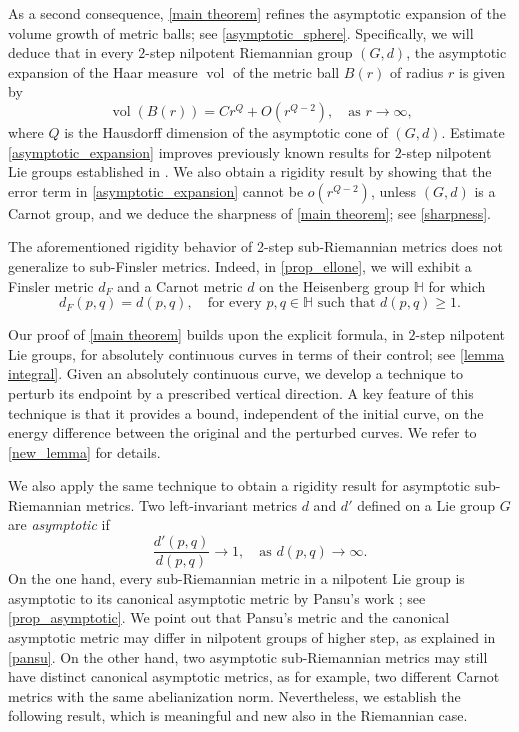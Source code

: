 \documentclass[a4paper,11pt,reqno]{amsart}
\theoremstyle{plain}
\theoremstyle{definition}
\renewcommand{\H}{\mathbb H}
\begin{document}
As a second consequence,
\cref{main theorem} refines the asymptotic expansion of the volume growth of metric balls; see \cref{asymptotic_sphere}. Specifically, we will deduce that in every $2$-step nilpotent Riemannian group $(G,d)$, the asymptotic expansion of the Haar measure $\operatorname{vol}$ of the metric ball $B(r)$ of radius $r$ is given by
\begin{equation} \label{asymptotic_expansion}
\operatorname{vol}(B(r)) = C r^Q + O(r^{Q-2}), \quad \text{as $r \to \infty$,} 
\end{equation}
where $Q$ is the Hausdorff dimension of the asymptotic cone of $(G,d)$. Estimate \eqref{asymptotic_expansion} improves previously known results for $2$-step nilpotent Lie groups established in \cite{MR3153949, MR4380060}. We also obtain a rigidity result by showing that the error term in \eqref{asymptotic_expansion} cannot be $o(r^{Q-2})$, unless $(G,d)$ is a Carnot group, and we deduce the sharpness of \cref{main theorem}; see \cref{sharpness}.

The aforementioned rigidity behavior of 2-step sub-Riemannian metrics does not generalize to sub-Finsler metrics. Indeed, in \cref{prop_ellone}, we will exhibit a Finsler metric $d_F$ and a Carnot metric $d$ on the Heisenberg group $\H$ for which 
$$ d_F(p,q) = d(p,q), \quad \text{for every $p,q \in \H$ such that $d(p,q) \ge 1$.}$$

Our proof of \cref{main theorem} builds upon the explicit formula, in $2$-step nilpotent Lie groups, for absolutely continuous curves in terms of their control; see \cref{lemma integral}. Given an absolutely continuous curve, we develop a technique to perturb its endpoint by a prescribed vertical direction. A key feature of this technique is that it provides a bound, independent of the initial curve, on the energy difference between the original and the perturbed curves. We refer to \cref{new_lemma} for details.

We also apply the same technique to obtain a rigidity result for asymptotic sub-Riemannian metrics. Two left-invariant metrics $d$ and $d'$ defined on a Lie group $G$ are \emph{asymptotic} if
$$ \frac{d'(p,q)}{d(p,q)} \to 1, \quad \text{as $d(p,q) \to \infty$.}$$
On the one hand, every sub-Riemannian metric in a nilpotent Lie group is asymptotic to its canonical asymptotic metric by Pansu's work \cite{MR741395}; see \cref{prop_asymptotic}. We point out that Pansu's metric and the canonical asymptotic metric may differ in nilpotent groups of higher step, as explained in \cref{pansu}.
On the other hand, two asymptotic sub-Riemannian metrics may still have distinct canonical asymptotic metrics, as for example, two different Carnot metrics with the same abelianization norm. Nevertheless, we establish the following result, which is meaningful and new also in the Riemannian case.
\end{document}
